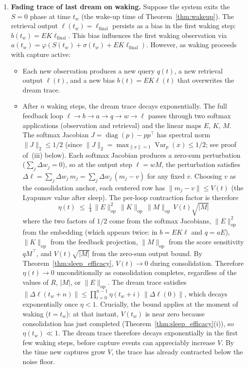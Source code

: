 \begin{theorem}
\begin{enumerate}
\item \textbf{Fading trace of last dream on waking.}  Suppose the system exits the $S = 0$ phase at time $t_w$ (the wake-up time of Theorem~\ref{thm:wakeup}).  The retrieval output $\ell(t_w) = \ell_{\mathrm{final}}$ persists as a bias in the first waking step: $b(t_w) = EK\ell_{\mathrm{final}}$.  This bias influences the first waking observation via $a(t_w) = \varphi(S(t_w) + \sigma(t_w) + EK\ell_{\mathrm{final}})$.  However, as waking proceeds with capture active:
\begin{itemize}
\item Each new observation produces a new query $q(t)$, a new retrieval output $\ell(t)$, and a new bias $b(t) = EK\ell(t)$ that overwrites the dream trace.
\item After $n$ waking steps, the dream trace decays exponentially.  The full feedback loop $\ell \to b \to a \to q \to w \to \ell$ passes through two softmax applications (observation and retrieval) and the linear maps $E$, $K$, $M$.  The softmax Jacobian $J = \operatorname{diag}(p) - pp^\top$ has spectral norm $\|J\|_2 \leq 1/2$ (since $\|J\|_2 = \max_{\|x\|=1}\operatorname{Var}_p(x) \leq 1/2$; see proof of~(iii) below).  Each softmax Jacobian produces a zero-sum perturbation ($\sum_j \Delta w_j = 0$), so at the output step $\ell = wM$, the perturbation satisfies $\Delta\ell = \sum_j \Delta w_j\,m_j = \sum_j \Delta w_j\,(m_j - v)$ for any fixed $v$.  Choosing $v$ as the consolidation anchor, each centered row has $\|m_j - v\| \leq V(t)$ (the Lyapunov value after sleep).  The per-loop contraction factor is therefore
\[
\eta(t) \;\leq\; \tfrac{1}{4}\,\|E\|_{\mathrm{op}}^2\,\|K\|_{\mathrm{op}}\,\|M\|_{\mathrm{op}}\,V(t)\sqrt{|M|}
\]
where the two factors of $1/2$ come from the softmax Jacobians, $\|E\|_{\mathrm{op}}^2$ from the embedding (which appears twice: in $b = EK\ell$ and $q = aE$), $\|K\|_{\mathrm{op}}$ from the feedback projection, $\|M\|_{\mathrm{op}}$ from the score sensitivity $qM^\top$, and $V(t)\sqrt{|M|}$ from the zero-sum output bound.  By Theorem~\ref{thm:sleep_efficacy}, $V(t) \to 0$ during consolidation.  Therefore $\eta(t) \to 0$ unconditionally as consolidation completes, regardless of the values of $R$, $|M|$, or $\|E\|_{\mathrm{op}}$.  The dream trace satisfies $\|\Delta\ell(t_w + n)\| \leq \prod_{i=0}^{n-1}\eta(t_w + i)\,\|\Delta\ell(0)\|$, which decays exponentially once $\eta < 1$.  Crucially, the bound applies at the moment of waking ($t = t_w$): at that instant, $V(t_w)$ is near zero because consolidation has just completed (Theorem~\ref{thm:sleep_efficacy}(i)), so $\eta(t_w) \ll 1$.  The dream trace therefore decays exponentially in the first few waking steps, before capture events can appreciably increase $V$.  By the time new captures grow $V$, the trace has already contracted below the noise floor.
\end{itemize}


\end{enumerate}
\end{theorem}
